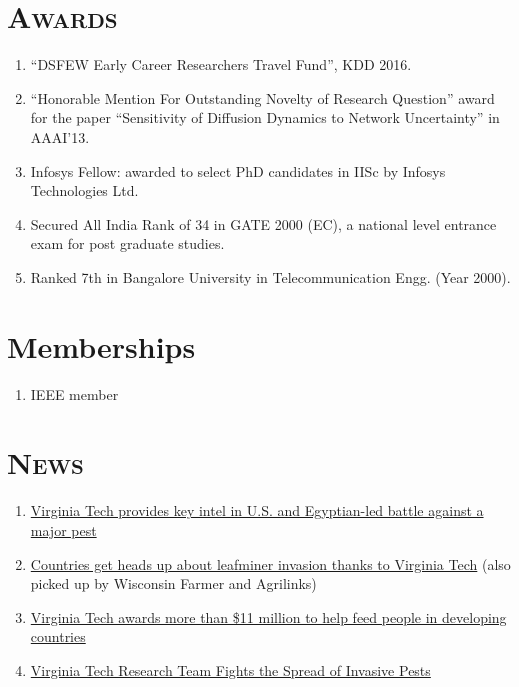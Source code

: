 \documentclass[10pt]{article} %
\begin{document}
\begin{resume}
\section{\textnormal{\textsc{Awards}}}
\begin{enumerate}[$\circ$]
   \item ``DSFEW Early Career Researchers Travel Fund'', KDD 2016.
\item ``Honorable Mention For Outstanding Novelty of Research
Question'' award for the paper ``Sensitivity of Diffusion Dynamics to
Network Uncertainty'' in AAAI'13.
\item Infosys Fellow: awarded to select
PhD candidates in IISc by Infosys Technologies Ltd. 
\item Secured All India Rank of 34 in GATE 2000 (EC), a national level
entrance exam for post graduate studies.
\item Ranked 7th in Bangalore University in Telecommunication Engg. (Year 2000).
\end{enumerate}
\section{\textnormal{Memberships}}
\begin{enumerate}[$\circ$]
\item IEEE member
\end{enumerate}
\section{\textnormal{\textsc{News}}}
\begin{enumerate}[$\circ$]
\item
\href{https://vtnews.vt.edu/articles/2018/03/outreach-ipmegyptfaw.html}{Virginia Tech provides key intel in U.S. and Egyptian-led battle against a major pest}
\item
\href{https://vtnews.vt.edu/articles/2018/02/outreach-ipmnexus.html}{Countries
get heads up about leafminer invasion thanks to Virginia Tech} (also picked
up by Wisconsin Farmer and Agrilinks)
\item
\href{https://vtnews.vt.edu/articles/2016/05/outreach-oiredinnovationlabawards.html}{Virginia Tech awards more than \$11 million to help feed people in
developing countries}
\item
\href{https://www.bi.vt.edu/ndssl/news/virginia-tech-research-team-fights-the-spread-of-invasive-pests}{Virginia
Tech Research Team Fights the Spread of Invasive Pests}
\end{enumerate}

\end{resume}
\end{document}
